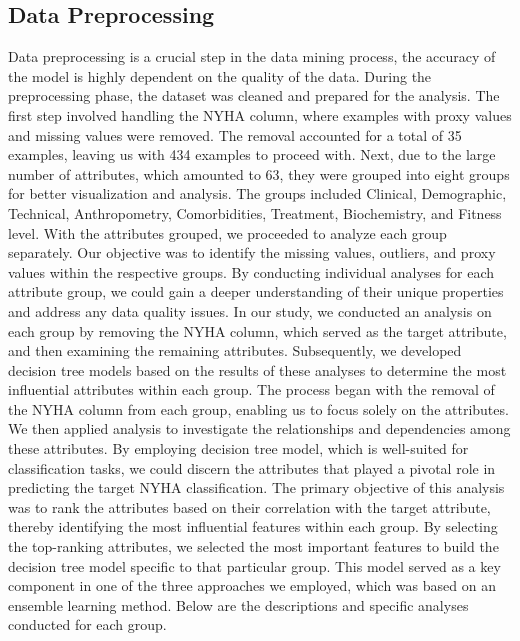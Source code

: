 \subsection{Data Preprocessing}
Data preprocessing is a crucial step in the data mining process, the accuracy of the model is highly dependent on the quality of the data. During the preprocessing phase, the dataset was cleaned and prepared for the analysis. The first step involved handling the NYHA column, where examples with proxy values and missing values were removed. The removal accounted for a total of 35 examples, leaving us with 434 examples to proceed with. Next, due to the large number of attributes, which amounted to 63, they were grouped into eight groups for better visualization and analysis. The groups included Clinical, Demographic, Technical, Anthropometry, Comorbidities, Treatment, Biochemistry, and Fitness level. With the attributes grouped, we proceeded to analyze each group separately. Our objective was to identify the missing values, outliers, and proxy values within the respective groups. By conducting individual analyses for each attribute group, we could gain a deeper understanding of their unique properties and address any data quality issues. 
In our study, we conducted an analysis on each group by removing the NYHA column, which served as the target attribute, and then examining the remaining attributes. 
Subsequently, we developed decision tree models based on the results of these analyses to determine the most influential attributes within each group.
The process began with the removal of the NYHA column from each group, enabling us to focus solely on the attributes. We then applied analysis to investigate the relationships and dependencies among these attributes. By employing decision tree model, which is well-suited for classification tasks, we could discern the attributes that played a pivotal role in predicting the target NYHA classification. 
The primary objective of this analysis was to rank the attributes based on their correlation with the target attribute, thereby identifying the most influential features within each group. By selecting the top-ranking attributes, we selected the most important features to build the decision tree model specific to that particular group. This model served as a key component in one of the three approaches we employed, which was based on an ensemble learning method. Below are the descriptions and specific analyses conducted for each group.

